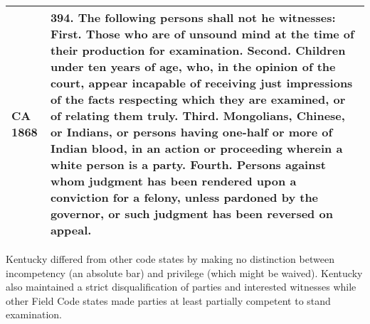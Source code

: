 \documentclass[12pt,]{article}
\begin{document}
\begin{longtable}[]{@{}ll@{}}
\begin{minipage}[t]{0.17\columnwidth}
CA 1868\strut
\end{minipage} & \begin{minipage}[t]{0.77\columnwidth}\raggedright
394. The following persons shall not he witnesses: First. Those who are
of unsound mind at the time of their production for examination. Second.
Children under ten years of age, who, in the opinion of the court,
appear incapable of receiving just impressions of the facts respecting
which they are examined, or of relating them truly. Third. Mongolians,
Chinese, or Indians, or persons having one-half or more of Indian blood,
in an action or proceeding wherein a white person is a party. Fourth.
Persons against whom judgment has been rendered upon a conviction for a
felony, unless pardoned by the governor, or such judgment has been
reversed on appeal.\strut
\end{minipage}\tabularnewline
\bottomrule
\end{longtable}

Kentucky differed from other code states by making no distinction
between incompetency (an absolute bar) and privilege (which might be
waived). Kentucky also maintained a strict disqualification of parties
and interested witnesses while other Field Code states made parties at
least partially competent to stand examination.
\end{document}
